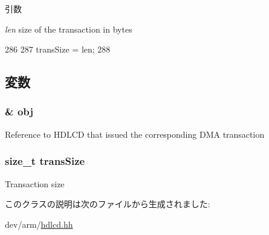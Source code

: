 \begin{DoxyParams}{引数}
\item[{\em len}]size of the transaction in bytes \end{DoxyParams}



\begin{DoxyCode}
286                                             {
287             transSize = len;
288         }
\end{DoxyCode}


\subsection{変数}
\hypertarget{classHDLcd_1_1DmaDoneEvent_a7f03e9152bceeb627cf7ecd2ce94781a}{
\subsubsection[{obj}]{\& {\bf obj}}}
\label{classHDLcd_1_1DmaDoneEvent_a7f03e9152bceeb627cf7ecd2ce94781a}
Reference to HDLCD that issued the corresponding DMA transaction \hypertarget{classHDLcd_1_1DmaDoneEvent_a2f0f49b234af2515eee766ba335f7dc3}{
\subsubsection[{transSize}]{\setlength{\rightskip}{0pt plus 5cm}size\_\-t {\bf transSize}}}
\label{classHDLcd_1_1DmaDoneEvent_a2f0f49b234af2515eee766ba335f7dc3}
Transaction size 

このクラスの説明は次のファイルから生成されました:\begin{DoxyCompactItemize}
\item 
dev/arm/\hyperlink{hdlcd_8hh}{hdlcd.hh}\end{DoxyCompactItemize}
